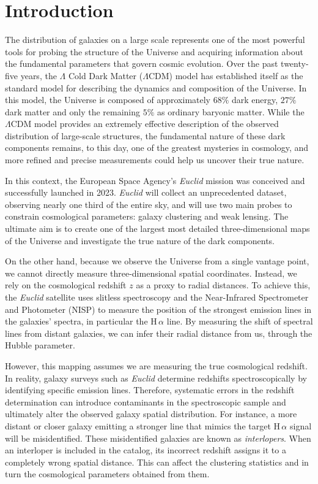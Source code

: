 \documentclass[12pt,a4paper,oneside]{report}
\begin{document}
\tableofcontents
\newpage


\chapter*{Introduction}\label{chap:Introduction}
The distribution of galaxies on a large scale represents one of the most powerful tools for probing the structure of the Universe and acquiring information about the fundamental parameters that govern cosmic evolution. Over the past twenty-five years, the $\Lambda$ Cold Dark Matter ($\Lambda \mathrm{CDM}$) model has established itself as the standard model for describing the dynamics and composition of the Universe. In this model, the Universe is composed of approximately $68\%$ dark energy, $27\%$ dark matter and only the remaining $5\%$ as ordinary baryonic matter. While the $\Lambda \mathrm{CDM}$ model provides an extremely effective description of the observed distribution of large-scale structures, the fundamental nature of these dark components remains, to this day, one of the greatest mysteries in cosmology, and more refined and precise measurements could help us uncover their true nature.

In this context, the European Space Agency's \textit{Euclid} mission was conceived and successfully launched in 2023. \textit{Euclid} will collect an unprecedented dataset, observing nearly one third of the entire sky, and will use two main probes to constrain cosmological parameters: galaxy clustering and weak lensing. The ultimate aim is to create one of the largest most detailed three-dimensional maps of the Universe and investigate the true nature of the dark components.

On the other hand, because we observe the Universe from a single vantage point, we cannot directly measure three-dimensional spatial coordinates. Instead, we rely on the cosmological redshift $z$ as a proxy to radial distances. To achieve this, the \textit{Euclid} satellite uses slitless spectroscopy and the Near-Infrared Spectrometer and Photometer (NISP) to measure the position of the strongest emission lines in the galaxies' spectra, in particular the $\mathrm{H}\,\alpha$ line. By measuring the shift of spectral lines from distant galaxies, we can infer their radial distance from us, through the Hubble parameter.

However, this mapping assumes we are measuring the true cosmological redshift. In reality, galaxy surveys such as \textit{Euclid} determine redshifts spectroscopically by identifying specific emission lines. Therefore, systematic errors in the redshift determination can introduce contaminants in the spectroscopic sample and ultimately alter the observed galaxy spatial distribution. For instance, a more distant or closer galaxy emitting a stronger line that mimics the target $\mathrm{H}\,\alpha$ signal will be misidentified. These misidentified galaxies are known as \textit{interlopers}. When an interloper is included in the catalog, its incorrect redshift assigns it to a completely wrong spatial distance. This can affect the clustering statistics and in turn the cosmological parameters obtained from them.
\end{document}

